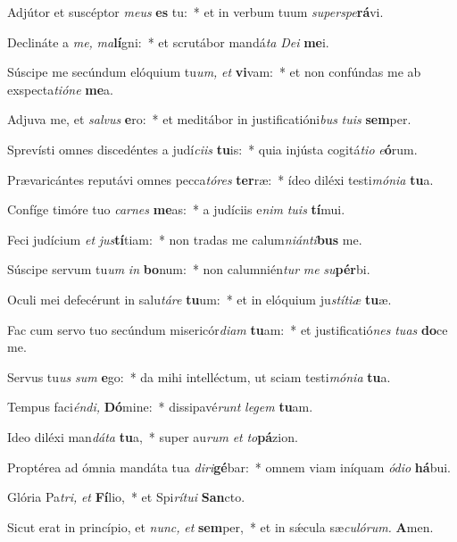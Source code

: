 \item Adjútor et suscéptor \textit{meus} \textbf{es} tu:~* et in verbum tuum \textit{superspe}\textbf{rá}vi.
\item Declináte a \textit{me,} \textit{ma}\textbf{lí}gni:~* et scrutábor mandá\textit{ta} \textit{Dei} \textbf{me}i.
\item Súscipe me secúndum elóquium tu\textit{um,} \textit{et} \textbf{vi}vam:~* et non confúndas me ab exspecta\tinyhspace\textit{tióne} \textbf{me}a.
\item Adjuva me, et \textit{salvus} \textbf{e}ro:~* et meditábor in justificatióni\textit{bus} \textit{tuis} \textbf{sem}per.
\item Sprevísti omnes discedéntes a judí\hspace*{0.01em}\textit{ciis} \textbf{tu}is:~* quia injústa cogitá\textit{tio} \textit{e}\textbf{ó}rum.
\item Prævaricántes reputávi omnes pecca\tinyhspace\textit{tóres} \textbf{ter}ræ:~* ídeo diléxi testi\textit{mónia} \textbf{tu}a.
\item Confíge timóre tuo \textit{carnes} \textbf{me}as:~* a judíciis e\textit{nim} \textit{tuis} \textbf{tí}mui.
\item Feci judícium \textit{et} \textit{jus}\textbf{tí}tiam:~* non tradas me calum\textit{niánti}\textbf{bus} me.
\item Súscipe servum tu\textit{um} \textit{in} \textbf{bo}num:~* non calumnién\tinyhspace\textit{tur} \textit{me} \textit{su}\textbf{pér}bi.
\item Oculi mei defecérunt in salu\textit{táre} \textbf{tu}um:~* et in elóquium ju\textit{stítiæ} \textbf{tu}æ.
\item Fac cum servo tuo secúndum misericór\textit{diam} \textbf{tu}am:~* et justificatió\textit{nes} \textit{tuas} \textbf{do}ce me.
\item Servus tu\textit{us} \textit{sum} \textbf{e}go:~* da mihi intellé\-ctum, ut sciam testi\textit{mónia} \textbf{tu}a.
\item Tempus faci\textit{éndi,} \textbf{Dó}mine:~* dissipavé\textit{runt} \textit{legem} \textbf{tu}am.
\item Ideo diléxi man\textit{dáta} \textbf{tu}a,~* super au\textit{rum} \textit{et} \textit{to}\textbf{pá}zion.
\item Proptérea ad ómnia mandáta tua \textit{diri}\textbf{gé}bar:~* omnem viam iníquam \textit{ódio} \textbf{há}bui.
\item Glória Pa\tinyhspace\textit{tri,} \textit{et} \textbf{Fí}lio,~* et Spi\tinyhspace\textit{rítui} \textbf{San}cto.
\item Sicut erat in princípio, et \textit{nunc,} \textit{et} \textbf{sem}per,~* et in sǽcula sæ\tinyhspace\textit{culórum.} \textbf{A}men.